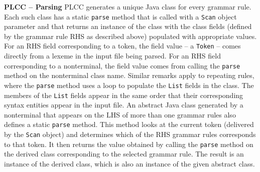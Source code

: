\begin{minipage}[t]{\sw}
\slidenumber
\LARGE
{\bf PLCC -- Parsing}\exx
PLCC generates a unique Java class for every grammar rule.
Each such class has a static \verb'parse' method
that is called with a \verb'Scan' object parameter
and that returns an instance of the class
with the class fields (defined by the grammar rule RHS as described above)
populated with appropriate values.
For an RHS field corresponding to a token,
the field value -- a \verb'Token' -- comes directly
from a lexeme in the input file being parsed.
For an RHS field corresponding to a nonterminal,
the field value comes from calling the \verb'parse' method
on the nonterminal class name.\exx
Similar remarks apply to repeating rules,
where the \verb'parse' method uses a loop
to populate the \verb'List' fields in the class.
The members of the \verb'List' fields appear
in the same order that their corresponding syntax entities
appear in the input file.\exx
An abstract Java class generated by a nonterminal
that appears on the LHS of more than one grammar rules
also defines a static \verb'parse' method.
This method looks at the current token (delivered by the \verb'Scan' object)
and determines which of the RHS grammar rules corresponds to that token.
It then returns the value obtained
by calling the \verb'parse' method on the derived class
corresponding to the selected grammar rule.
The result is an instance of the derived class,
which is also an instance of the given abstract class.
\end{minipage}
\clearpage
